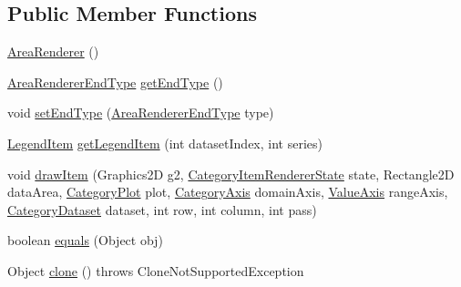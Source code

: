 \subsection*{Public Member Functions}
\begin{DoxyCompactItemize}
\item 
\mbox{\hyperlink{classorg_1_1jfree_1_1chart_1_1renderer_1_1category_1_1_area_renderer_a99fdd48db27288f77093c24fcd5f5943}{Area\+Renderer}} ()
\item 
\mbox{\hyperlink{classorg_1_1jfree_1_1chart_1_1renderer_1_1_area_renderer_end_type}{Area\+Renderer\+End\+Type}} \mbox{\hyperlink{classorg_1_1jfree_1_1chart_1_1renderer_1_1category_1_1_area_renderer_ab2696ac02805a7c75d191a5731d821fe}{get\+End\+Type}} ()
\item 
void \mbox{\hyperlink{classorg_1_1jfree_1_1chart_1_1renderer_1_1category_1_1_area_renderer_ac5e2ecaa5a1cf0d8a49f1915b97dbe39}{set\+End\+Type}} (\mbox{\hyperlink{classorg_1_1jfree_1_1chart_1_1renderer_1_1_area_renderer_end_type}{Area\+Renderer\+End\+Type}} type)
\item 
\mbox{\hyperlink{classorg_1_1jfree_1_1chart_1_1_legend_item}{Legend\+Item}} \mbox{\hyperlink{classorg_1_1jfree_1_1chart_1_1renderer_1_1category_1_1_area_renderer_ac0e7bac40efae55815f961d1074b6873}{get\+Legend\+Item}} (int dataset\+Index, int series)
\item 
void \mbox{\hyperlink{classorg_1_1jfree_1_1chart_1_1renderer_1_1category_1_1_area_renderer_ab82b9b680daac05d897107edf19fe843}{draw\+Item}} (Graphics2D g2, \mbox{\hyperlink{classorg_1_1jfree_1_1chart_1_1renderer_1_1category_1_1_category_item_renderer_state}{Category\+Item\+Renderer\+State}} state, Rectangle2D data\+Area, \mbox{\hyperlink{classorg_1_1jfree_1_1chart_1_1plot_1_1_category_plot}{Category\+Plot}} plot, \mbox{\hyperlink{classorg_1_1jfree_1_1chart_1_1axis_1_1_category_axis}{Category\+Axis}} domain\+Axis, \mbox{\hyperlink{classorg_1_1jfree_1_1chart_1_1axis_1_1_value_axis}{Value\+Axis}} range\+Axis, \mbox{\hyperlink{interfaceorg_1_1jfree_1_1data_1_1category_1_1_category_dataset}{Category\+Dataset}} dataset, int row, int column, int pass)
\item 
boolean \mbox{\hyperlink{classorg_1_1jfree_1_1chart_1_1renderer_1_1category_1_1_area_renderer_ac45200dc31b1dc39ba52a7fb59b7a734}{equals}} (Object obj)
\item 
Object \mbox{\hyperlink{classorg_1_1jfree_1_1chart_1_1renderer_1_1category_1_1_area_renderer_a9328b4d1542f453ccea0de6f37588403}{clone}} ()  throws Clone\+Not\+Supported\+Exception 
\end{DoxyCompactItemize}
